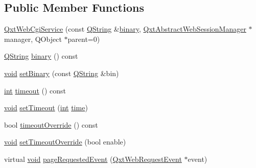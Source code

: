 \subsection*{Public Member Functions}
\begin{DoxyCompactItemize}
\item 
\hyperlink{class_qxt_web_cgi_service_a1fcea59fb3a8da588486637b16ddd0f9}{Qxt\-Web\-Cgi\-Service} (const \hyperlink{group___u_a_v_objects_plugin_gab9d252f49c333c94a72f97ce3105a32d}{Q\-String} \&\hyperlink{class_qxt_web_cgi_service_a1f591d6e1a2d78f576046f983b778c85}{binary}, \hyperlink{class_qxt_abstract_web_session_manager}{Qxt\-Abstract\-Web\-Session\-Manager} $\ast$manager, Q\-Object $\ast$parent=0)
\item 
\hyperlink{group___u_a_v_objects_plugin_gab9d252f49c333c94a72f97ce3105a32d}{Q\-String} \hyperlink{class_qxt_web_cgi_service_a1f591d6e1a2d78f576046f983b778c85}{binary} () const 
\item 
\hyperlink{group___u_a_v_objects_plugin_ga444cf2ff3f0ecbe028adce838d373f5c}{void} \hyperlink{class_qxt_web_cgi_service_a5156f6b23c2966f700b15af2b709b4bd}{set\-Binary} (const \hyperlink{group___u_a_v_objects_plugin_gab9d252f49c333c94a72f97ce3105a32d}{Q\-String} \&bin)
\item 
\hyperlink{ioapi_8h_a787fa3cf048117ba7123753c1e74fcd6}{int} \hyperlink{class_qxt_web_cgi_service_abf4b6a35e5b8df70de532f60306d51ad}{timeout} () const 
\item 
\hyperlink{group___u_a_v_objects_plugin_ga444cf2ff3f0ecbe028adce838d373f5c}{void} \hyperlink{class_qxt_web_cgi_service_a33d4eec39877d21eea2f62610d617bc9}{set\-Timeout} (\hyperlink{ioapi_8h_a787fa3cf048117ba7123753c1e74fcd6}{int} \hyperlink{analyze_raw_8m_a70c092a6aebace0b1ea406e14da78a40}{time})
\item 
bool \hyperlink{class_qxt_web_cgi_service_a10d54c7422b9069b523974b9b6ac5c74}{timeout\-Override} () const 
\item 
\hyperlink{group___u_a_v_objects_plugin_ga444cf2ff3f0ecbe028adce838d373f5c}{void} \hyperlink{class_qxt_web_cgi_service_a6931deb479791ab1be40b82bc63494db}{set\-Timeout\-Override} (bool enable)
\item 
virtual \hyperlink{group___u_a_v_objects_plugin_ga444cf2ff3f0ecbe028adce838d373f5c}{void} \hyperlink{class_qxt_web_cgi_service_ab75c5afbb276aa689670a91f504e1cde}{page\-Requested\-Event} (\hyperlink{class_qxt_web_request_event}{Qxt\-Web\-Request\-Event} $\ast$event)
\end{DoxyCompactItemize}


